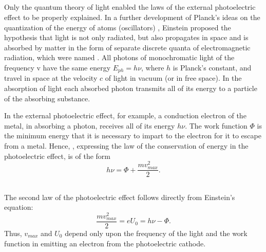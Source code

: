 \subsection{}\label{37.1.4} Only the quantum theory of light enabled the laws of the external photoelectric effect to be properly explained. In a further development of Planck's ideas on the quantization of the energy of atoms (oscillators) , Einstein proposed the hypothesis that light is not only radiated, but also propagates in space and is absorbed by matter in the form of separate discrete quanta of electromagnetic radiation, which were named . All photons of monochromatic light of the frequency v have the same energy $E_{ph}= h\nu$, where $h$ is Planck's constant, and travel in space at the velocity $c$ of light in vacuum (or in free space). In the absorption of light each absorbed photon transmits all of its energy to a particle of the absorbing substance.

In the external photoelectric effect, for example, a conduction
electron of the metal, in absorbing a photon, receives
all of its energy $h\nu$. The work function $\Phi$  is the minimum energy that it is necessary to impart to the electron for it to escape from a metal. Hence, , expressing the law of the conservation of energy in the photoelectric effect, is of the form
\begin{equation*}%
h \nu = \Phi + \frac{mv^{2}_{max}}{2}.
\end{equation*}

\subsection{}\label{37.1.5} The second law of the photoelectric effect follows directly from Einstein's equation:
\begin{equation*}%
\frac{mv^{2}_{max}}{2} = eU_{0} = h \nu - \Phi. 
\end{equation*}
Thus, $v_{max}$ and $U_{0}$ depend only upon the frequency of the light and the work function in emitting an electron from the photoelectric cathode.

